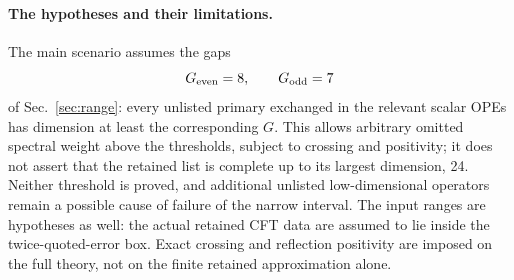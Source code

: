 \documentclass[11pt,a4paper]{article}
\numberwithin{equation}{section}
\begin{document}
\paragraph{The hypotheses and their limitations.} The main scenario assumes the gaps
\begin{equation}
 G_{\rm even}=8,\qquad G_{\rm odd}=7
 \label{eq:cone:gaps}
\end{equation}
of Sec.~\ref{sec:range}: every unlisted primary exchanged in the relevant scalar OPEs has dimension at least the
corresponding $G$. This allows arbitrary omitted spectral weight above the thresholds, subject to crossing and
positivity; it does not assert that the retained list is complete up to its largest dimension, 24. Neither threshold is
proved, and additional unlisted low-dimensional operators remain a possible cause of failure of the narrow interval.
The input ranges are hypotheses as well: the actual retained CFT data are assumed to lie inside the
twice-quoted-error box. Exact crossing and reflection positivity are imposed on the full theory, not on the finite
retained approximation alone.
\end{document}
